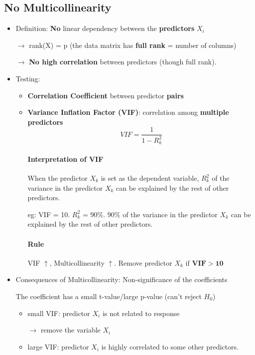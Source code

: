 \subsection{No Multicollinearity}
\begin{itemize}
	\item Definition: \textbf{No} linear dependency between the \textbf{predictors} $X_i$
	
	$\rightarrow$ rank(X) = p (the data matrix has \textbf{full rank} = number of columns)
	
	$\rightarrow$ \textbf{No high correlation} between predictors (though full rank). 
	
	
	
	
	\item Testing: 
	\begin{itemize}
		\item \textbf{Correlation Coefficient} between predictor \textbf{pairs}
		\item \textbf{Variance Inflation Factor (VIF)}: correlation among \textbf{multiple predictors}
		$$VIF = \frac{1}{1-R^2_k}$$
		\paragraph{Interpretation of VIF} 
		
		When the predictor $X_k$ is set as the dependent variable, $R^2_k$ of the variance in the predictor $X_k$ can be explained by the rest of other predictors.
		
		eg: VIF = 10. $R^2_k$ = 90\%. 90\% of the variance in the predictor $X_k$ can be explained by the rest of other predictors.
		
		\paragraph{Rule} VIF $\uparrow$, Multicollinearity $\uparrow$. Remove predictor $X_k$ if $\mathbf{VIF >10}$
		
	\end{itemize}

	\item Consequences of Multicollinearity: Non-significance of the coefficients
	
	The coefficient has a small t-value/large p-value (can't reject $H_0$)
	\begin{itemize}
		\item small VIF: predictor $X_i$ is not related to response 
		
		$\rightarrow$ remove the variable $X_i$
		\item large VIF: predictor $X_i$ is highly correlated to some other predictors. 
		

\end{itemize}
\end{itemize}
